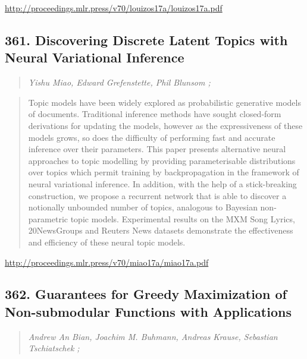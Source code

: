 \documentclass{article}
\begin{document}
\href{http://proceedings.mlr.press/v70/louizos17a/louizos17a.pdf}{http://proceedings.mlr.press/v70/louizos17a/louizos17a.pdf}

\subsection{361. Discovering Discrete Latent Topics with Neural Variational Inference}

\begin{quote}
\footnotesize{\textit{Yishu Miao, Edward Grefenstette, Phil Blunsom ;}}

\end{quote}

\begin{quote}
    Topic models have been widely explored as probabilistic generative models of documents. Traditional inference methods have sought closed-form derivations for updating the models, however as the expressiveness of these models grows, so does the difficulty of performing fast and accurate inference over their parameters. This paper presents alternative neural approaches to topic modelling by providing parameterisable distributions over topics which permit training by backpropagation in the framework of neural variational inference. In addition, with the help of a stick-breaking construction, we propose a recurrent network that is able to discover a notionally unbounded number of topics, analogous to Bayesian non-parametric topic models. Experimental results on the MXM Song Lyrics, 20NewsGroups and Reuters News datasets demonstrate the effectiveness and efficiency of these neural topic models.  
\end{quote}

\href{http://proceedings.mlr.press/v70/miao17a/miao17a.pdf}{http://proceedings.mlr.press/v70/miao17a/miao17a.pdf}

\subsection{362. Guarantees for Greedy Maximization of Non-submodular Functions with Applications}

\begin{quote}
\footnotesize{\textit{Andrew An Bian, Joachim M. Buhmann, Andreas Krause, Sebastian Tschiatschek ;}}

\end{quote}
\end{document}
